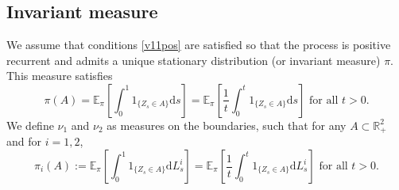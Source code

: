 \documentclass[11pt]{article}
\theoremstyle{definition}
\newtheorem{deffr}[thm]{Definition}
\begin{document}
\subsection{Invariant measure}
\label{intro:subsec:mesinvgreen}


We assume that conditions \eqref{v11pos} are satisfied so that the process is positive recurrent and admits a unique stationary distribution (or invariant measure) $\pi$. This measure satisfies
$$
\pi(A)=\mathbb{E}_{\pi} \left[  \int_0^1 1_{\{Z_s \in A\}} \mathrm{d}s \right]= \mathbb{E}_{\pi} \left[ \frac{1}{t} \int_0^t 1_{\{Z_s \in A\}} \mathrm{d}s \right]
\text{ for all } t>0.
$$
We define $\nu_1$ and $\nu_2$ as measures on the boundaries,
such that for any $A\subset\mathbb{R}_+^2$ and for $i=1,2$,
\begin{equation}
\label{intro:eq:def:mesinvbords}
\pi_i (A) := \mathbb{E}_{\pi} \left[ \int_0^1 1_{\{Z_s \in A\}} \mathrm{d}L_s^i \right]
= \mathbb{E}_{\pi} \left[ \frac{1}{t} \int_0^t 1_{\{Z_s \in A\}} \mathrm{d}L_s^i \right]
\text{ for all } t>0
.
\end{equation}
\end{document}
